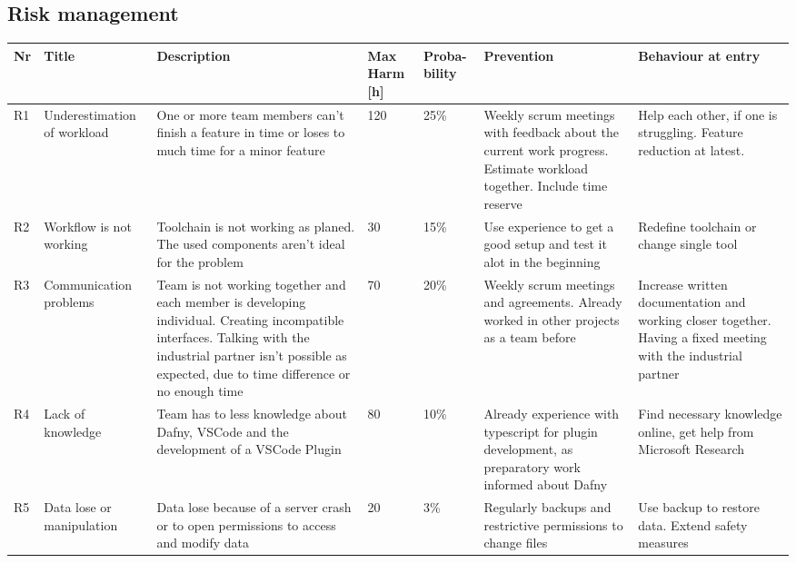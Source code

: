 \subsection{Risk management}
\begin{landscape}
	\begin{longtable}[H]
		{l|p{}| p{} | p{} | p{} | p{} | p{}}
		
		\textbf{Nr} & \textbf{Title} & \textbf{Description} & 
		\textbf{Max Harm [h]} & \textbf{Proba- bility} & \textbf{Prevention} &  
		\textbf{Behaviour at entry}\\ \hline
		
		R1 & Underestimation of workload & One or more team members can't finish a feature in time or loses to much time for a minor feature & 120 & 25\% & Weekly scrum meetings with feedback about the current work progress. Estimate workload together. Include time reserve & Help each other, if one is struggling. Feature reduction at latest. \\ 
		
		R2 & Workflow is not working & Toolchain is not working as planed. The used components aren't ideal for the problem & 30 & 15\% & Use experience to get a good setup and test it alot in the beginning & Redefine toolchain or change single tool \\ 
		
		R3 & Communication problems & Team is not working together and each member is developing individual. Creating incompatible interfaces. Talking with the industrial partner isn't possible as expected, due to time difference or no enough time & 70 & 20\% & Weekly scrum meetings and agreements. Already worked in other projects as a team before & Increase written documentation and working closer together. Having a fixed meeting with the industrial partner \\ 
		
		R4 & Lack of knowledge & Team has to less knowledge about Dafny, VSCode and the development of a VSCode Plugin & 80 & 10\% & Already experience with typescript for plugin development, as preparatory work informed about Dafny & Find necessary knowledge online, get help from Microsoft Research \\ 
		
		R5 & Data lose or manipulation & Data lose because of a server crash or to open permissions to access and modify data & 20 & 3\% & Regularly backups and restrictive permissions to change files & Use backup to restore data. Extend safety measures \\ 
		

\end{longtable}
\end{landscape}
